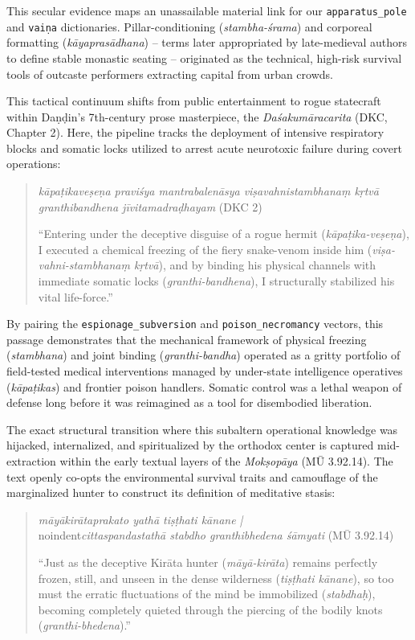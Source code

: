 \documentclass[11pt,twoside,letterpaper]{article}
\begin{document}
This secular evidence maps an unassailable material link for our \texttt{apparatus\_pole} and \texttt{vaiṇa} dictionaries. Pillar-conditioning (\textit{stambha-śrama}) and corporeal formatting (\textit{kāyaprasādhana}) -- terms later appropriated by late-medieval authors to define stable monastic seating -- originated as the technical, high-risk survival tools of outcaste performers extracting capital from urban crowds.

This tactical continuum shifts from public entertainment to rogue statecraft within Daṇḍin's 7th-century prose masterpiece, the \textit{Daśakumāracarita} (DKC, Chapter 2). Here, the pipeline tracks the deployment of intensive respiratory blocks and somatic locks utilized to arrest acute neurotoxic failure during covert operations:

\begin{quote}
\small
\textit{kāpaṭikaveṣeṇa praviśya mantrabalenāsya viṣavahnistambhanaṃ kṛtvā granthibandhena jīvitamadraḍhayam} (DKC 2)
\medskip

``Entering under the deceptive disguise of a rogue hermit (\textit{kāpaṭika-veṣeṇa}), I executed a chemical freezing of the fiery snake-venom inside him (\textit{viṣa-vahni-stambhanaṃ kṛtvā}), and by binding his physical channels with immediate somatic locks (\textit{granthi-bandhena}), I structurally stabilized his vital life-force.''
\end{quote}

By pairing the \texttt{espionage\_subversion} and \texttt{poison\_necromancy} vectors, this passage demonstrates that the mechanical framework of physical freezing (\textit{stambhana}) and joint binding (\textit{granthi-bandha}) operated as a gritty portfolio of field-tested medical interventions managed by under-state intelligence operatives (\textit{kāpaṭikas}) and frontier poison handlers. Somatic control was a lethal weapon of defense long before it was reimagined as a tool for disembodied liberation.

The exact structural transition where this subaltern operational knowledge was hijacked, internalized, and spiritualized by the orthodox center is captured mid-extraction within the early textual layers of the \textit{Mokṣopāya} (MŪ 3.92.14). The text openly co-opts the environmental survival traits and camouflage of the marginalized hunter to construct its definition of meditative stasis:

\begin{quote}
\small
\noindent\textit{māyākirātaprakato yathā tiṣṭhati kānane |} \\noindent\textit{cittaspandastathā stabdho granthibhedena śāmyati} (MŪ 3.92.14)
\medskip

``Just as the deceptive Kirāta hunter (\textit{māyā-kirāta}) remains perfectly frozen, still, and unseen in the dense wilderness (\textit{tiṣṭhati kānane}), so too must the erratic fluctuations of the mind be immobilized (\textit{stabdhaḥ}), becoming completely quieted through the piercing of the bodily knots (\textit{granthi-bhedena}).''
\end{quote}
\end{document}

